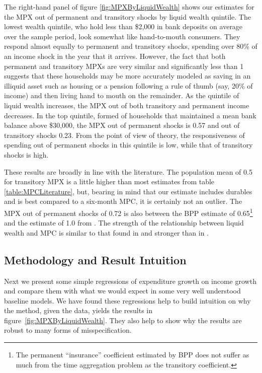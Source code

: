 \documentclass[titlepage]{\econtex}\newcommand{\texname}{ConsumptionHeterogeneity}
\begin{document}
	The right-hand panel of figure \ref{fig:MPXByLiquidWealth} shows our estimates for the MPX out of permanent and transitory shocks by liquid wealth quintile. The lowest wealth quintile, who hold less than \$2,000 in bank deposits on average over the sample period, look somewhat like hand-to-mouth consumers. They respond almost equally to permanent and transitory shocks, spending over 80\% of an income shock in the year that it arrives. However, the fact that both permanent and transitory MPXs are very similar and significantly less than 1 suggests that these households may be more accurately modeled as saving in an illiquid asset such as housing or a pension following a rule of thumb (say, 20\% of income) and then living hand to mouth on the remainder. As the quintile of liquid wealth increases, the MPX out of both transitory and permanent income decreases. In the top quintile, formed of households that maintained a mean bank balance above \$30,000, the MPX out of permanent shocks is 0.57 and out of transitory shocks 0.23. From the point of view of theory, the responsiveness of spending out of permanent shocks in this quintile is low, while that of transitory shocks is high.

	These results are broadly in line with the literature. The population mean of 0.5 for transitory MPX is a little higher than most estimates from table \ref{table:MPCLiterature}, but, bearing in mind that our estimate includes durables and is best compared to a six-month MPC, it is certainly not an outlier. The MPX out of permanent shocks of 0.72 is also between the BPP estimate of 0.65\footnote{The permanent ``insurance'' coefficient estimated by BPP does not suffer as much from the time aggregation problem as the transitory coefficient.} and the estimate of 1.0 from \cite{gelman_response_2016}. The strength of the relationship between liquid wealth and MPC is similar to that found in \cite{gelman_what_2016} and stronger than in \cite{fagereng_mpc_2016}.
	
	\subsection{Methodology and Result Intuition} \label{method_intuit}
	Next we present some simple regressions of expenditure growth on income growth and compare them with what we would expect in some very well understood baseline models. We have found these regressions help to build intuition on why the method, given the data, yields the results in figure~\ref{fig:MPXByLiquidWealth}. They also help to show why the results are robust to many forms of misspecification.
	
\end{document}
